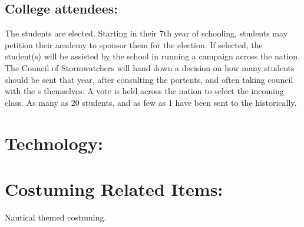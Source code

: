 \documentclass[blue]{GL2020}
\begin{document}
\subsection*{College attendees:}
The \pShip{} \pSchool{} students are elected. Starting in their 7th year of schooling, students may petition their academy to sponsor them for the election. If selected, the student(s) will be assisted by the school in running a campaign across the nation. The Council of Stormwatchers will hand down a decision on how many students should be sent that year, after consulting the portents, and often taking council with the \cEbb{\God}s themselves. A vote is held across the nation to select the incoming class. As many as 20 students, and as few as 1 have been sent to the \pSc{} historically.

\section{Technology:}

\section{Costuming Related Items:}
Nautical themed costuming.
\end{document}
